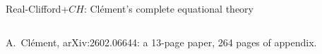 \begin{frame}{Real-Clifford+$CH$: Clément's complete equational theory \New}
\begin{columns}[c]
\begin{column}{0.53\textwidth}
\renewcommand{\AgdaCodeStyle}{\scriptsize}
\small A.\ Clément, arXiv:2602.06644: a 13-page paper, \alert{264 pages} of appendix.
\begin{code}%
\>[0]\AgdaSpace{}%
\AgdaSpace{}%
\AgdaSymbol{:}\AgdaSpace{}%
\AgdaSpace{}%
\AgdaSpace{}%
\AgdaSpace{}%
\<%
\\
\>[0][@{}l@{\AgdaIndent{0}}]%
\>[2]%
\>[10]\AgdaSymbol{:}\AgdaSpace{}%
\AgdaSpace{}%
\<%
\\
%
\>[2]%
\>[10]\AgdaSymbol{:}\AgdaSpace{}%
\AgdaSpace{}%
\<%
\\
%
\>[2]\AgdaSpace{}%
\AgdaSymbol{:}\AgdaSpace{}%
\AgdaSpace{}%
\<%
\\
%
\>[2]\AgdaSpace{}%
\AgdaSymbol{:}\AgdaSpace{}%
\AgdaSpace{}%
\<%
\\
%
\\[\AgdaEmptyExtraSkip]%
\>[0]\AgdaSpace{}%
\AgdaSymbol{:}\AgdaSpace{}%
\AgdaSpace{}%
\AgdaSymbol{(}\AgdaSpace{}%
\AgdaSymbol{)}%
\>[22]\<%
\\
\>[0]\AgdaSpace{}%
\AgdaSymbol{=}\AgdaSpace{}%
\AgdaSpace{}%
\AgdaSpace{}%
\AgdaSpace{}%
\AgdaSpace{}%
\AgdaSpace{}%
\AgdaSpace{}%
\AgdaSpace{}%
\AgdaSpace{}%
\AgdaSpace{}%
\AgdaSpace{}%
\AgdaSpace{}%
\AgdaSpace{}%
\AgdaSpace{}%
\AgdaSpace{}%
\AgdaSpace{}%
\AgdaSpace{}%
\AgdaSpace{}%
\AgdaSpace{}%

\end{code}
\end{column}
\end{columns}
\end{frame}

